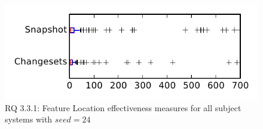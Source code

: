 
\begin{figure}
\centering
\includegraphics[height=0.4\textheight]{figures/flt_seed/rq1_tiny_24}
\caption{RQ 3.3.1: Feature Location effectiveness measures for all subject systems with $seed=24$}
\label{fig:flt_seed:rq1:tiny}
\end{figure}
